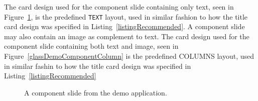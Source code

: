 The card design used for the component slide containing only text, seen in Figure~\ref{glassDemoComponentText}, is the predefined \texttt{TEXT} layout, used in similar fashion to how the title card design was specified in Listing~\ref{listingRecommended}. A component slide may also contain an image as complement to text. The card design used for the component slide containing both text and image, seen in Figure~\ref{glassDemoComponentColumn} is the predefined COLUMNS layout, used in similar fashin to how the title card design was specified in Listing~\ref{listingRecommended}

		\begin{figure}[ht!]
		\centering
   		 \qquad
   		 \qquad
		\caption{A component slide from the demo application.}
		\label{glassDemoComponentText}
	\end{figure}

